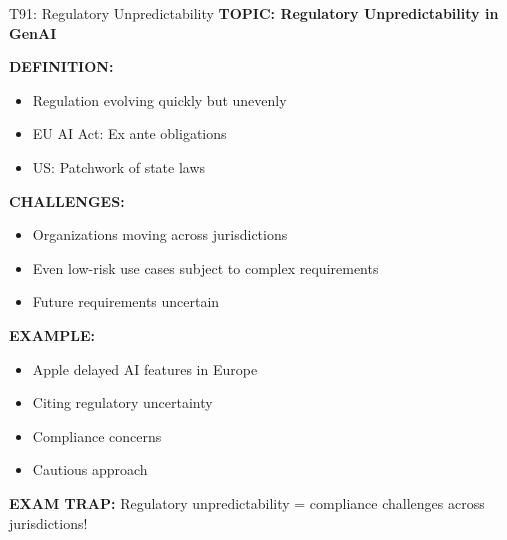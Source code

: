 \documentclass[8pt]{beamer}
\begin{document}
	\begin{frame}{T91: Regulatory Unpredictability}
		\fontsize{6.5}{7.5}\selectfont
		\textbf{TOPIC: Regulatory Unpredictability in GenAI}
		
		\vspace{0.1cm}
		\textbf{DEFINITION:}
		\begin{itemize}
			\item Regulation evolving quickly but unevenly
			\item EU AI Act: Ex ante obligations
			\item US: Patchwork of state laws
		\end{itemize}
		
		\vspace{0.1cm}
		\textbf{CHALLENGES:}
		\begin{itemize}
			\item Organizations moving across jurisdictions
			\item Even low-risk use cases subject to complex requirements
			\item Future requirements uncertain
		\end{itemize}
		
		\vspace{0.1cm}
		\textbf{EXAMPLE:}
		\begin{itemize}
			\item Apple delayed AI features in Europe
			\item Citing regulatory uncertainty
			\item Compliance concerns
			\item Cautious approach
		\end{itemize}
		
		\textcolor{myred}{\textbf{EXAM TRAP:}} Regulatory unpredictability = \textcolor{myblue}{compliance challenges across jurisdictions}!
	\end{frame}
	
\end{document}
